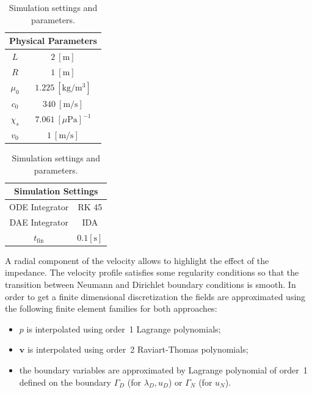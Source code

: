 \documentclass{ifacconf}
\begin{document}
\begin{table}[t]
	\centering
	\begin{tabular}{|c|c|}
		\hline 
		\multicolumn{2}{|c|}{Physical Parameters} \\ 
		\hline 
		$L$ & $2\ [\textrm{m}]$ \\ 
		$R$ & $1\ [\textrm{m}]$ \\
		$\mu_0$ & $1.225\ [\textrm{kg}/\textrm{m}^3]$ \\ 
		$c_0$ & $340\ [\textrm{m/s}]$ \\
        $\chi_s$ & $7.061 \ [\mu\textrm{Pa}]^{-1}$ \\ 
		$v_0$ & $1\ [\textrm{m/s}]$ \\ 
		\hline 
	\end{tabular} 
	\begin{tabular}{|c|c|}
		\hline 
		\multicolumn{2}{|c|}{Simulation Settings} \\ 
		\hline 
		ODE Integrator & RK 45\\
		DAE Integrator & IDA\\ 
		$t_{\text{fin}}$& $0.1  [\textrm{s}]$ \\ 
		\hline 
	\end{tabular} 
	\vspace{1mm}
	\caption{Simulation settings and parameters.}
	\label{tab:par}
\end{table}

A radial component of the velocity allows to highlight the effect of the impedance. The velocity profile satisfies some regularity conditions so that the transition between Neumann and Dirichlet boundary conditions is smooth. In order to get a finite dimensional discretization the fields are approximated using the following finite element families for both approaches:

\begin{itemize}
    \item $p$ is interpolated using order~1 Lagrange polynomials;
    \item $\bm{v}$ is interpolated using order~2 Raviart-Thomas polynomials;
    \item the boundary variables are approximated by Lagrange polynomial of order~1 defined on the boundary $\Gamma_D$ (for $\lambda_D, u_D$) or $\Gamma_N$ (for $u_N$).
\end{itemize}
\end{document}
